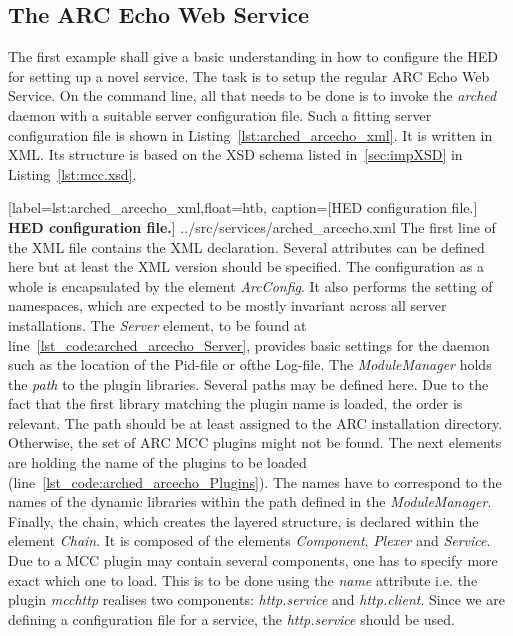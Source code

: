 \subsection{The ARC Echo Web Service}


The first example shall give a basic understanding in how to configure the HED for setting up a novel service.
The task is to setup the regular ARC Echo Web Service.
On the command line, all that needs to be done is to invoke the \textit{arched} daemon with a suitable server configuration file.
Such a fitting server configuration file is shown in Listing~\ref{lst:arched_arcecho_xml}.
It is written in XML. Its structure is based on the XSD schema listed in~\ref{sec:impXSD} in Listing~\ref{lst:mcc.xsd}.\\ 


	[label=lst:arched_arcecho_xml,float=htb,
	caption={[HED configuration file.]
	\textbf{HED configuration file.}}]
{../src/services/arched_arcecho.xml}
The first line of the XML file contains the XML declaration.
Several attributes can be defined here but at least the XML version should be specified.
The configuration as a whole is encapsulated by the element \textit{ArcConfig}. It also performs the setting of namespaces, which are expected to be mostly invariant across all server installations. %
The \textit{Server} element, to be found at line~\ref{lst_code:arched_arcecho_Server}, provides basic settings for the daemon such as the location of the Pid-file or ofthe Log-file.
The \textit{ModuleManager} holds the \textit{path} to the plugin libraries.
Several paths may be defined here.
Due to the fact that the first library matching the plugin name is loaded, the order is relevant.
The path should be at least assigned to the ARC installation directory.
Otherwise, the set of ARC MCC plugins might not be found.
The next elements are holding the name of the plugins to be loaded (line~\ref{lst_code:arched_arcecho_Plugins}).
The names have to correspond to the names of the dynamic libraries within the path defined in the \textit{ModuleManager}.
Finally, the chain, which creates the layered structure, is declared within the element \textit{Chain}.
It is composed of the elements \textit{Component}, \textit{Plexer} and \textit{Service}.
Due to a MCC plugin may contain several components, one has to specify more exact which one to load. This is to be done using the \textit{name} attribute i.e. the plugin \textit{mcchttp} realises two components: \textit{http.service} and \textit{http.client}. Since we are defining a configuration file for a service, the \textit{http.service} should be used.
